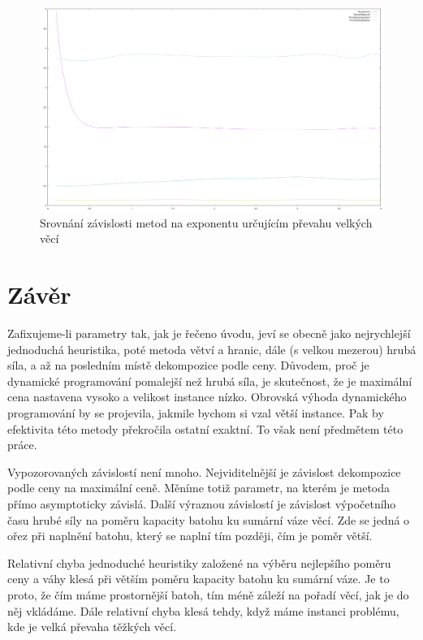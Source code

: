 \documentclass[12pt,a4paper]{article}
\begin{document}
\begin{figure}[H]
\begin{center}
\includegraphics[width=\textwidth]{exp/big/allExecTimes}
\caption{Srovnání závislosti metod na exponentu určujícím převahu velkých věcí}
\label{exp/big/allExecTimes}
\end{center}
\end{figure}








\section{Závěr}

Zafixujeme-li parametry tak, jak je řečeno úvodu, jeví se obecně jako nejrychlejší jednoduchá heuristika, poté metoda větví a hranic, dále (s velkou mezerou) hrubá síla, a až na posledním místě dekompozice podle ceny. Důvodem, proč je dynamické programování pomalejší než hrubá síla, je skutečnost, že je maximální cena nastavena vysoko a velikost instance nízko. Obrovská výhoda dynamického programování by se projevila, jakmile bychom si vzal větší instance. Pak by efektivita této metody překročila ostatní exaktní. To však není předmětem této práce.

Vypozorovaných závislostí není mnoho. Nejviditelnější je závislost dekompozice podle ceny na maximální ceně. Měníme totiž parametr, na kterém je metoda přímo asymptoticky závislá. Další výraznou závislostí je závislost výpočetního času hrubé síly na poměru kapacity batohu ku sumární váze věcí. Zde se jedná o ořez při naplnění batohu, který se naplní tím později, čím je poměr větší. 

Relativní chyba jednoduché heuristiky založené na výběru nejlepšího poměru ceny a váhy klesá při větším poměru kapacity batohu ku sumární váze. Je to proto, že čím máme prostornější batoh, tím méně záleží na pořadí věcí, jak je do něj vkládáme. Dále relativní chyba klesá tehdy, když máme instanci problému, kde je velká převaha těžkých věcí.
\end{document}
